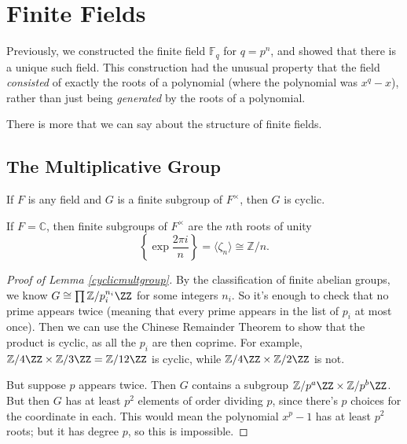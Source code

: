 

\section{Finite Fields}

Previously, we constructed the finite field $\mathbb{F}_q$ for $q = p^n$, and showed that there is a unique such field. This construction had the unusual property that the field \emph{consisted} of exactly the roots of a polynomial (where the polynomial was $x^q - x$), rather than just being \emph{generated} by the roots of a polynomial. 

There is more that we can say about the structure of finite fields. 

\subsection{The Multiplicative Group}

\vspace{0.75em}

\begin{lemma}\label{cyclicmultgroup}
    If $F$ is any field and $G$ is a finite subgroup of $F^\times$, then $G$ is cyclic. 
\end{lemma}

\begin{example}
    If $F = \mathbb{C}$, then finite subgroups of $F^\times$ are the $n$th roots of unity \[\left\{\exp \frac{2\pi i}{n} \right\} = \langle \zeta_n \rangle \cong \mathbb{Z}/n.\] 
\end{example}

\begin{proof}[Proof of Lemma \ref{cyclicmultgroup}]
    By the classification of finite abelian groups, we know $G \cong \prod \mathbb{Z}/p_i^{n_i}\ZZ$ for some integers $n_i$. So it's enough to check that no prime appears twice (meaning that every prime appears in the list of $p_i$ at most once). Then we can use the Chinese Remainder Theorem to show that the product is cyclic, as all the $p_i$ are then coprime. For example, $\mathbb{Z}/4\ZZ \times \mathbb{Z}/3\ZZ = \mathbb{Z}/12\ZZ$ is cyclic, while $\mathbb{Z}/4\ZZ \times \mathbb{Z}/2\ZZ$ is not. 

    But suppose $p$ appears twice. Then $G$ contains a subgroup $\mathbb{Z}/p^a\ZZ \times \mathbb{Z}/p^b\ZZ$. But then $G$ has at least $p^2$ elements of order dividing $p$, since there's $p$ choices for the coordinate in each. This would mean the polynomial $x^p - 1$ has at least $p^2$ roots; but it has degree $p$, so this is impossible. 
\end{proof}

